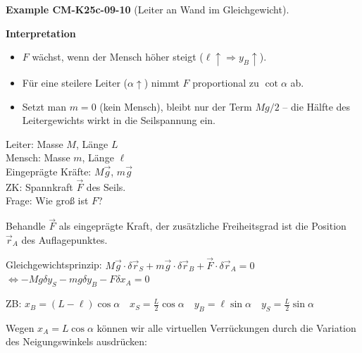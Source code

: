 \documentclass[10pt, letterpaper]{article}
\newcommand{\CustomHeading}[3]{%
  \par\medskip\noindent%
  \textbf{#1 #2} \textnormal{(#3)}.\enskip%
}
\newenvironment{EXA}[2]{\begin{unitbox}\CustomHeading{Example}{#1}{#2}}{\end{unitbox}}
\begin{document}
\begin{EXA}{CM-K25c-09-10}{Leiter an Wand im Gleichgewicht}
\textbf{Interpretation}

\begin{itemize}
\item $F$ wächst, wenn der Mensch höher steigt
      ($\ell\!\uparrow\Rightarrow y_B\uparrow$).
\item Für eine steilere Leiter ($\alpha\!\uparrow$)
      nimmt $F$ proportional zu $\cot\alpha$ ab.
\item Setzt man $m=0$ (kein Mensch), bleibt nur der Term
      $Mg/2$ – die Hälfte des Leitergewichts wirkt in die Seil­spannung
      ein.
\end{itemize}
\end{EXA}





\begin{center}
\end{center}

Leiter: Masse $M$, Länge $L$\\
Mensch: Masse $m$, Länge $\ell$\\
Eingeprägte Kräfte: $M\vec{g}$, $m\vec{g}$\\
ZK: Spannkraft $\vec{F}$ des Seils.\\
Frage: Wie groß ist $F$?

Behandle $\vec{F}$ als eingeprägte Kraft, der zusätzliche Freiheitsgrad ist die Position $\vec{r}_A$ des Auflagepunktes.

Gleichgewichtsprinzip: $M\vec{g} \cdot \delta\vec{r}_S + m\vec{g} \cdot \delta\vec{r}_B + \vec{F} \cdot \delta\vec{r}_A = 0$
$\Leftrightarrow -Mg \delta y_S - mg \delta y_B - F\delta x_A = 0$

ZB: $x_B = (L-\ell)\cos\alpha \quad x_S = \frac{L}{2} \cos\alpha \quad
    y_B = \ell \sin\alpha \quad y_S = \frac{L}{2} \sin\alpha$

Wegen $x_A = L\cos\alpha$ können wir alle virtuellen Verrückungen durch die Variation des Neigungswinkels ausdrücken:
\end{document}
